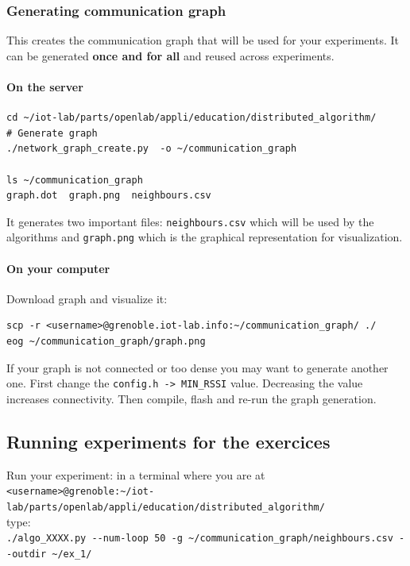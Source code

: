 \documentclass{article}
\begin{document}
\subsubsection{Generating communication graph}

This creates the communication graph that
will be used for your experiments. It can be generated \textbf{once and for all} and
reused across experiments.

\paragraph{On the server}

\begin{verbatim}cd ~/iot-lab/parts/openlab/appli/education/distributed_algorithm/
# Generate graph
./network_graph_create.py  -o ~/communication_graph

ls ~/communication_graph
graph.dot  graph.png  neighbours.csv \end{verbatim}

It generates two important files:
\texttt{neighbours.csv} which will be used by the algorithms and
\texttt{graph.png} which is the graphical representation for visualization.

\paragraph{On your computer} Download graph and visualize it:
\begin{verbatim}scp -r <username>@grenoble.iot-lab.info:~/communication_graph/ ./
eog ~/communication_graph/graph.png\end{verbatim}

If your graph is not connected or too dense you may want to generate another one.
First change the \verb=config.h -> MIN_RSSI= value. Decreasing the value
increases connectivity. Then compile, flash and re-run the graph generation.



\subsection{Running experiments for the exercices}

Run your experiment: in a terminal where you are at \\
\verb=<username>@grenoble:~/iot-lab/parts/openlab/appli/education/distributed_algorithm/= \\
type:\\
 \verb=./algo_XXXX.py --num-loop 50 -g ~/communication_graph/neighbours.csv --outdir ~/ex_1/= \\
\end{document}
